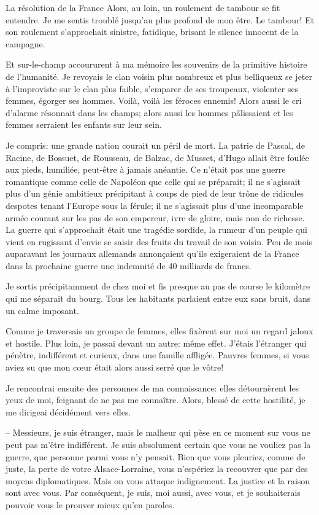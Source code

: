 \begin{chapter}{La résolution de la France}
Alors, au loin, un roulement de tambour se fit entendre. Je me sentis
troublé jusqu'au plus profond de mon être. Le tambour! Et son roulement
s'approchait sinistre, fatidique, brisant le silence innocent de la
campagne.

Et sur-le-champ accoururent à ma mémoire les souvenirs de la primitive
histoire de l'humanité. Je revoyais le clan voisin plus nombreux et plus
belliqueux se jeter à l'improviste sur le clan plus faible, s'emparer de
ses troupeaux, violenter ses femmes, égorger ses hommes. Voilà, voilà
les féroces ennemis! Alors aussi le cri d'alarme résonnait dans les
champs; alors aussi les hommes pâlissaient et les femmes serraient les
enfants sur leur sein.

Je compris: une grande nation courait un péril de mort. La patrie de
Pascal, de Racine, de Bossuet, de Rousseau, de Balzac, de Musset, d'Hugo
allait être foulée aux pieds, humiliée, peut-être à jamais anéantie. Ce
n'était pas une guerre romantique comme celle de Napoléon que celle qui
se préparait; il ne s'agissait plus d'un génie ambitieux précipitant à
coups de pied de leur trône de ridicules despotes tenant l'Europe sous
la férule; il ne s'agissait plus d'une incomparable armée courant sur
les pas de son empereur, ivre de gloire, mais non de richesse. La guerre
qui s'approchait était une tragédie sordide, la rumeur d'un peuple qui
vient en rugissant d'envie se saisir des fruits du travail de son
voisin. Peu de mois auparavant les journaux allemands annonçaient
qu'ils exigeraient de la France dans la prochaine guerre une indemnité
de 40 milliards de francs.

Je sortis précipitamment de chez moi et fis presque au pas de course le
kilomètre qui me séparait du bourg. Tous les habitants parlaient entre
eux sans bruit, dans un calme imposant.

Comme je traversais un groupe de femmes, elles fixèrent sur moi un
regard jaloux et hostile. Plus loin, je passai devant un autre: même
effet. J'étais l'étranger qui pénètre, indifférent et curieux, dans une
famille affligée. Pauvres femmes, si vous aviez su que mon cœur était
alors aussi serré que le vôtre!

Je rencontrai ensuite des personnes de ma connaissance: elles
détournèrent les yeux de moi, feignant de ne pas me connaître. Alors,
blessé de cette hostilité, je me dirigeai décidément vers elles.

--  Messieurs, je suis étranger, mais le malheur qui pèse en ce moment
sur vous ne peut pas m'être indifférent. Je suis absolument certain que
vous ne vouliez pas la guerre, que personne parmi vous n'y pensait. Bien
que vous pleuriez, comme de juste, la perte de votre Alsace-Lorraine,
vous n'espériez la recouvrer que par des moyens diplomatiques. Mais on
vous attaque indignement. La justice et la raison sont avec vous. Par
conséquent, je suis, moi aussi, avec vous, et je souhaiterais pouvoir
vous le prouver mieux qu'en paroles.


\end{chapter}
